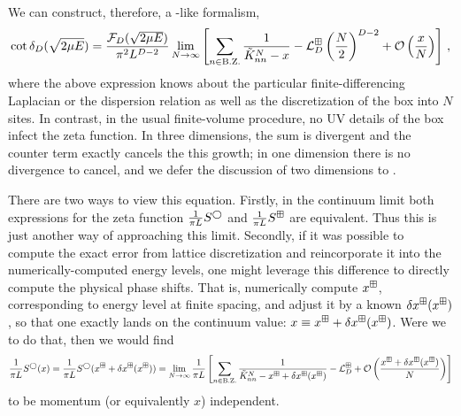 We can construct, therefore, a \Luscher-like formalism,
\begin{align}
    \label{eq:dispersion quantization}
    \cot \delta_D( \sqrt{2 \mu E} )
    = 
	\frac{\mathcal{F}_D(\sqrt{2 \mu E})}{\pi^2 L^{D-2}}
	\lim_{N\rightarrow\infty} 
    \left[
    	\sum_{n\in\text{B.Z.}}\frac{1}{ \tilde K_{nn}^{N} - x} - \mathcal{L}_D^{\boxplus}\left(\frac{N}{2}\right)^{D-2}
		+ \mathcal O\left(\frac{x}{N}\right)
	\right]\, ,
\end{align}
where the above expression knows about the particular finite-differencing Laplacian or the dispersion relation as well as the discretization of the box into $N$ sites. 
In contrast, in the usual finite-volume procedure, no UV details of the box infect the zeta function.
In three dimensions, the sum is divergent and the counter term exactly cancels the this growth; in one dimension there is no divergence to cancel, and we defer the discussion of two dimensions to .

There are two ways to view this equation.
Firstly, in the continuum limit both expressions for the zeta function $\frac{1}{\pi L}S^\bigcirc$ and $\frac{1}{\pi L}S^\boxplus$ are equivalent.
Thus this is just another way of approaching this limit.
Secondly, if it was possible to compute the exact error from lattice discretization and reincorporate it into the numerically-computed energy levels, one might leverage this difference to directly compute the physical phase shifts.
That is, numerically compute $x^\boxplus$, corresponding to energy level at finite spacing, and adjust it by a known $\delta x^\boxplus(x^\boxplus)$, so that one exactly lands on the continuum value: $x \equiv x^\boxplus + \delta x^\boxplus(x^\boxplus)$.
Were we to do that, then we would find
\begin{equation}
    \frac{1}{\pi L}S^\bigcirc(x)
    =
    \frac{1}{\pi L}S^\bigcirc(x^\boxplus+\delta x^\boxplus(x^\boxplus))
    =
    \lim_{N\to \infty}
    \frac{1}{\pi L}\left[
        \sum_{n\in\text{B.Z.}}\frac{1}{\tilde{K}^N_{nn}-x^\boxplus+\delta x^\boxplus(x^\boxplus)} - \mathcal{L}^\boxplus_D + \mathcal{O}\left(\frac{x^\boxplus+\delta x^\boxplus(x^\boxplus)}{N}\right)
    \right]
\end{equation}
to be momentum (or equivalently $x$) independent.

